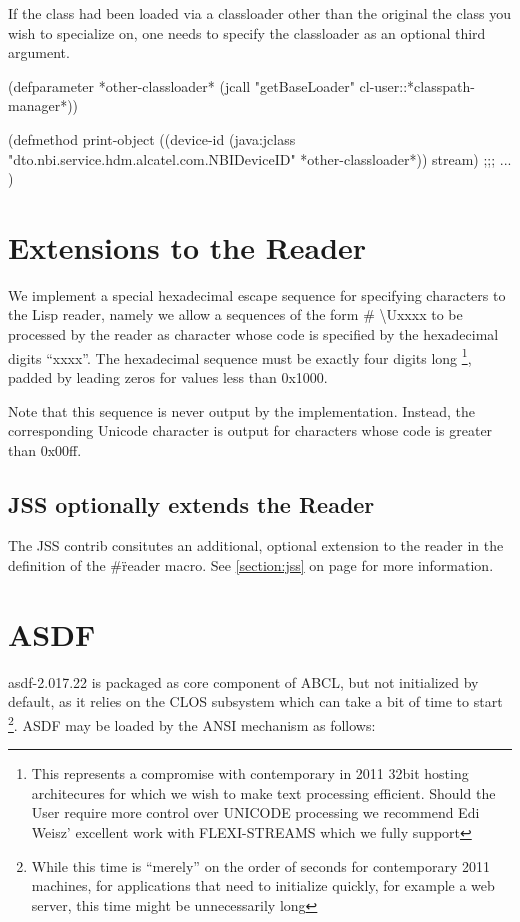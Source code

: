 \documentclass[10pt]{book}
\begin{document}
If the class had been loaded via a classloader other than the original
the class you wish to specialize on, one needs to specify the
classloader as an optional third argument.

\begin{listing-lisp}

(defparameter *other-classloader*
  (jcall "getBaseLoader" cl-user::*classpath-manager*))
  
(defmethod print-object ((device-id (java:jclass "dto.nbi.service.hdm.alcatel.com.NBIDeviceID" *other-classloader*))
                         stream)
  ;;; ...
)
\end{listing-lisp}

\section{Extensions to the Reader}

We implement a special hexadecimal escape sequence for specifying
characters to the Lisp reader, namely we allow a sequences of the form
\# \textbackslash Uxxxx to be processed by the reader as character
whose code is specified by the hexadecimal digits ``xxxx''.  The
hexadecimal sequence must be exactly four digits long \footnote{This
  represents a compromise with contemporary in 2011 32bit hosting
  architecures for which we wish to make text processing efficient.
  Should the User require more control over UNICODE processing we
  recommend Edi Weisz' excellent work with FLEXI-STREAMS which we
  fully support}, padded by leading zeros for values less than 0x1000.

Note that this sequence is never output by the implementation.  Instead,
the corresponding Unicode character is output for characters whose
code is greater than 0x00ff.

\subsection{JSS optionally extends the Reader}

The JSS contrib consitutes an additional, optional extension to the
reader in the definition of the \#\" reader macro.  See
\ref{section:jss} on page \pageref{section:jss} for more information.

\section{ASDF}

asdf-2.017.22 is packaged as core component of ABCL, but not
initialized by default, as it relies on the CLOS subsystem which can
take a bit of time to start \footnote{While this time is ``merely'' on
  the order of seconds for contemporary 2011 machines, for
  applications that need to initialize quickly, for example a web
  server, this time might be unnecessarily long}.  ASDF may be loaded
by the \textsc{ANSI}  mechanism as follows:
\end{document}

